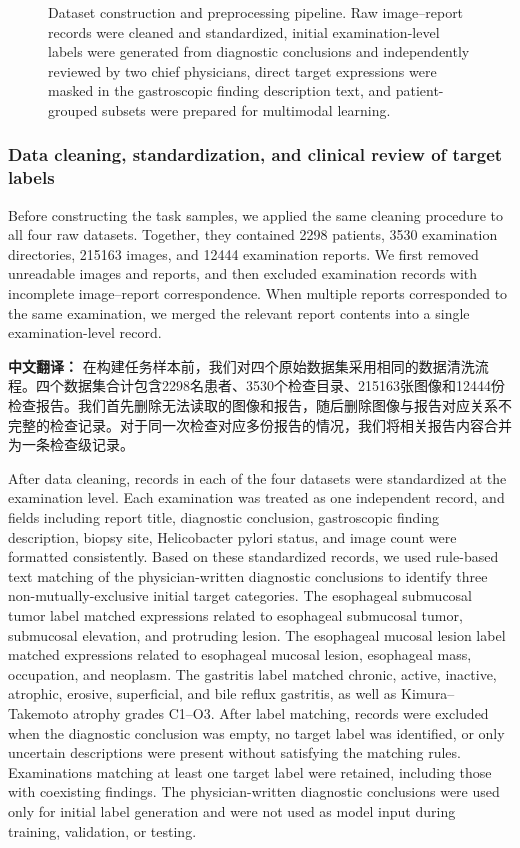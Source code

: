 \documentclass[Afour,sagev,times]{sagej}
\begin{document}
\begin{figure}[t]
\centering
\caption{Dataset construction and preprocessing pipeline. Raw image--report records were cleaned and standardized, initial examination-level labels were generated from diagnostic conclusions and independently reviewed by two chief physicians, direct target expressions were masked in the gastroscopic finding description text, and patient-grouped subsets were prepared for multimodal learning.\label{fig:dataset_pipeline}}
\end{figure}

\subsubsection{Data cleaning, standardization, and clinical review of target labels}

Before constructing the task samples, we applied the same cleaning procedure to all four raw datasets. Together, they contained 2298 patients, 3530 examination directories, 215163 images, and 12444 examination reports. We first removed unreadable images and reports, and then excluded examination records with incomplete image--report correspondence. When multiple reports corresponded to the same examination, we merged the relevant report contents into a single examination-level record.

\textbf{中文翻译：} 在构建任务样本前，我们对四个原始数据集采用相同的数据清洗流程。四个数据集合计包含2298名患者、3530个检查目录、215163张图像和12444份检查报告。我们首先删除无法读取的图像和报告，随后删除图像与报告对应关系不完整的检查记录。对于同一次检查对应多份报告的情况，我们将相关报告内容合并为一条检查级记录。

After data cleaning, records in each of the four datasets were standardized at the examination level. Each examination was treated as one independent record, and fields including report title, diagnostic conclusion, gastroscopic finding description, biopsy site, Helicobacter pylori status, and image count were formatted consistently. Based on these standardized records, we used rule-based text matching of the physician-written diagnostic conclusions to identify three non-mutually-exclusive initial target categories. The esophageal submucosal tumor label matched expressions related to esophageal submucosal tumor, submucosal elevation, and protruding lesion. The esophageal mucosal lesion label matched expressions related to esophageal mucosal lesion, esophageal mass, occupation, and neoplasm. The gastritis label matched chronic, active, inactive, atrophic, erosive, superficial, and bile reflux gastritis, as well as Kimura--Takemoto atrophy grades C1--O3. After label matching, records were excluded when the diagnostic conclusion was empty, no target label was identified, or only uncertain descriptions were present without satisfying the matching rules. Examinations matching at least one target label were retained, including those with coexisting findings. The physician-written diagnostic conclusions were used only for initial label generation and were not used as model input during training, validation, or testing.
\end{document}
